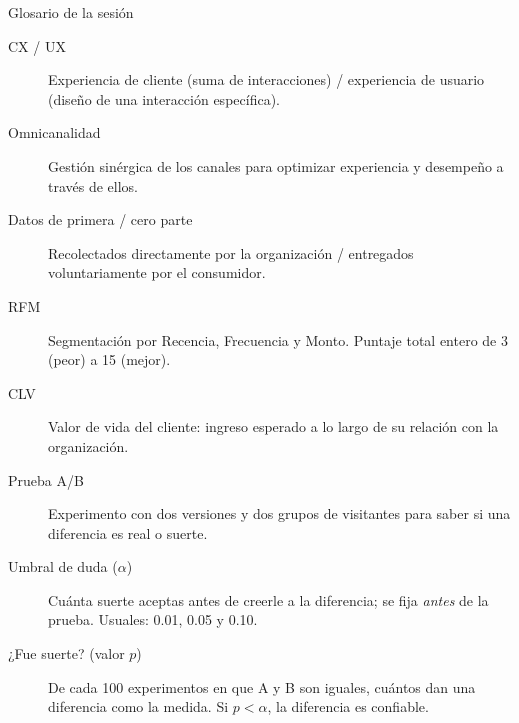 \documentclass[aspectratio=169,xcolor=dvipsnames]{beamer}
\begin{document}
\begin{frame}{Glosario de la sesión}
\scriptsize
\begin{description}
  \item[CX / UX] Experiencia de cliente (suma de interacciones) / experiencia de usuario (diseño de una interacción específica).
  \item[Omnicanalidad] Gestión sinérgica de los canales para optimizar experiencia y desempeño a través de ellos.
  \item[Datos de primera / cero parte] Recolectados directamente por la organización / entregados voluntariamente por el consumidor.
  \item[RFM] Segmentación por Recencia, Frecuencia y Monto. Puntaje total entero de 3 (peor) a 15 (mejor).
  \item[CLV] Valor de vida del cliente: ingreso esperado a lo largo de su relación con la organización.
  \item[Prueba A/B] Experimento con dos versiones y dos grupos de visitantes para saber si una diferencia es real o suerte.
  \item[Umbral de duda ($\alpha$)] Cuánta suerte aceptas antes de creerle a la diferencia; se fija \textit{antes} de la prueba. Usuales: 0.01, 0.05 y 0.10.
  \item[¿Fue suerte? (valor $p$)] De cada 100 experimentos en que A y B son iguales, cuántos dan una diferencia como la medida. Si $p<\alpha$, la diferencia es confiable.
\end{description}
\end{frame}
\end{document}
